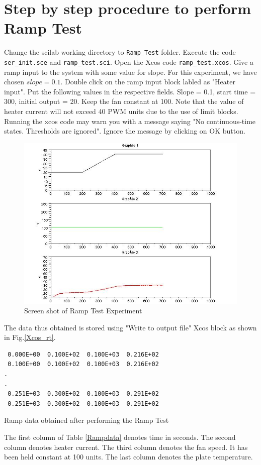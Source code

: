 \section{Step by step procedure to perform Ramp Test}
Change the scilab working directory to {\tt Ramp\_Test} folder. Execute the code {\tt ser\_init.sce} and {\tt ramp\_test.sci}. Open the Xcos code {\tt ramp\_test.xcos}. Give a ramp input to the system with some value for slope. For this experiment, we have chosen $slope = 0.1$. Double click on the ramp input block labled as "Heater input". Put the following values in the respective fields. Slope = 0.1, start time = 300, initial output = 20. Keep the fan constant at 100. Note that the value of heater current will not exceed 40 PWM units due to the use of limit blocks. Running the xcos code may warn you with a message saying "No continuous-time states. Thresholds are ignored". Ignore the message by clicking on OK button.
\begin{figure}
\centering
\includegraphics[width=\linewidth]{Ramp-test_manual/ramp_plot.jpg}
\caption{Screen shot of Ramp Test Experiment}
\end{figure}
The data thus obtained is stored using "Write to output file" Xcos block as shown in Fig.\ref{Xcos_rt}.
\begin{table}
\begin{verbatim}
 0.000E+00  0.100E+02  0.100E+03  0.216E+02
 0.100E+00  0.100E+02  0.100E+03  0.216E+02
.
.
 0.251E+03  0.300E+02  0.100E+03  0.291E+02
 0.251E+03  0.300E+02  0.100E+03  0.291E+02
\end{verbatim}
\caption{Ramp data obtained after performing the Ramp Test}
\label{Rampdata}
\end{table}
The first column of Table \ref{Rampdata} denotes time in seconds. The second column denotes heater current. The third column denotes the fan speed. It has been held constant at 100 units. The last column denotes the plate temperature.
\\
